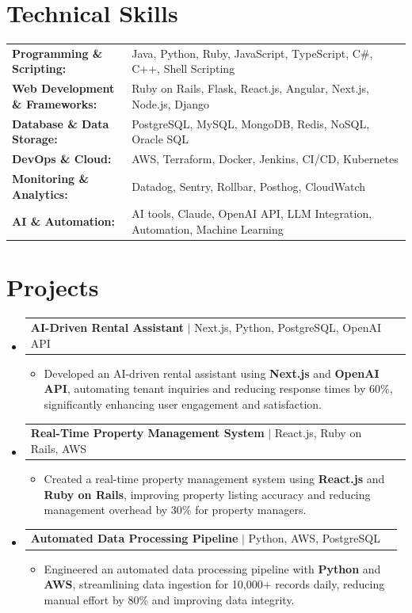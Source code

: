 \documentclass[letterpaper,10pt]{article}
\makeatletter
\newcommand{\resumeItem}[1]{
  \item{\fontsize{8pt}{9pt}\selectfont
    #1 \vspace{-3pt}
  }
}
\newcommand{\resumeProjectHeading}[2]{
    \item
    \begin{tabular*}{1.001\textwidth}{l@{\extracolsep{\fill}}r}
      \fontsize{8.5pt}{10pt}#1 & \textbf{\fontsize{8.5pt}{10pt} #2}\\
    \end{tabular*}\vspace{-7pt}
}
\newcommand{\resumeSubHeadingListStart}{\begin{itemize}[leftmargin=0pt, label={}]}
\newcommand{\resumeSubHeadingListEnd}{\end{itemize}}
\newcommand{\resumeItemListStart}{\begin{itemize}[leftmargin=*]}
\newcommand{\resumeItemListEnd}{\end{itemize}\vspace{-5pt}}
\makeatother
\begin{document}
\section{Technical Skills}
        \vspace{-14pt}
        \begin{table}[h]
            \fontsize{8pt}{9pt}\selectfont
            \begin{tabular}{p{0.3\linewidth} p{0.7\linewidth}}
                \textbf{Programming \& Scripting:} & Java, Python, Ruby, JavaScript, TypeScript, C\#, C++, Shell Scripting \\
                \textbf{Web Development \& Frameworks:} & Ruby on Rails, Flask, React.js, Angular, Next.js, Node.js, Django \\
                \textbf{Database \& Data Storage:} & PostgreSQL, MySQL, MongoDB, Redis, NoSQL, Oracle SQL \\
                \textbf{DevOps \& Cloud:} & AWS, Terraform, Docker, Jenkins, CI/CD, Kubernetes \\
                \textbf{Monitoring \& Analytics:} & Datadog, Sentry, Rollbar, Posthog, CloudWatch \\
                \textbf{AI \& Automation:} & AI tools, Claude, OpenAI API, LLM Integration, Automation, Machine Learning \\
            \end{tabular}
        \end{table}
 \vspace{-18pt}

\section{Projects}
    \vspace{-5pt}
    \resumeSubHeadingListStart
          \resumeProjectHeading
            {\textbf{AI-Driven Rental Assistant} $|$ Next.js, Python, PostgreSQL, OpenAI API}{}
            \resumeItemListStart
                \resumeItem{Developed an AI-driven rental assistant using \textbf{Next.js} and \textbf{OpenAI API}, automating tenant inquiries and reducing response times by 60\%, significantly enhancing user engagement and satisfaction.}
            \resumeItemListEnd
        \vspace{-12pt}
    
        \resumeProjectHeading
            {\textbf{Real-Time Property Management System} $|$ React.js, Ruby on Rails, AWS}{}
        \resumeItemListStart
                \resumeItem{Created a real-time property management system using \textbf{React.js} and \textbf{Ruby on Rails}, improving property listing accuracy and reducing management overhead by 30\% for property managers.}
        \resumeItemListEnd
      \vspace{-12pt}
      \resumeProjectHeading
        {\textbf{Automated Data Processing Pipeline} $|$ Python, AWS, PostgreSQL}{}
    \resumeItemListStart
            \resumeItem{Engineered an automated data processing pipeline with \textbf{Python} and \textbf{AWS}, streamlining data ingestion for 10,000+ records daily, reducing manual effort by 80\% and improving data integrity.}
    \resumeItemListEnd
    \resumeSubHeadingListEnd
\end{document}
